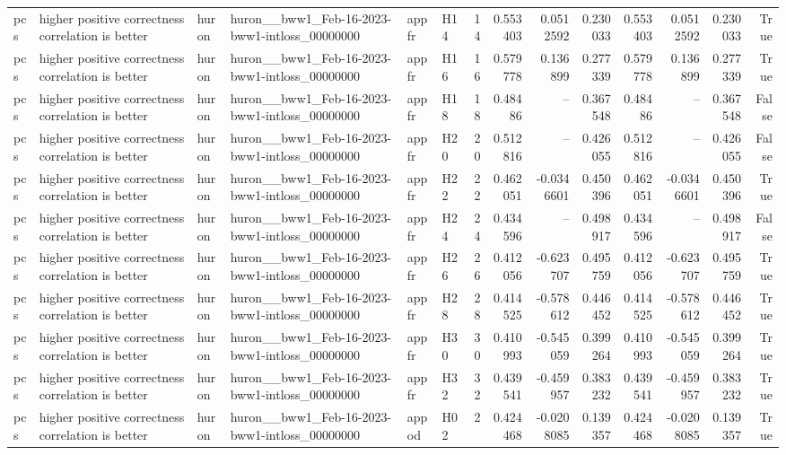 \begin{longtable}{llllllrrrrrrrr}
pcs & higher positive correctness correlation is better & huron & huron\_\_bww1\_Feb-16-2023-bww1-intloss\_00000000 & appfr & H14 & 14 & 0.553403 & 0.0512592 & 0.230033 & 0.553403 & 0.0512592 & 0.230033 & True \\
pcs & higher positive correctness correlation is better & huron & huron\_\_bww1\_Feb-16-2023-bww1-intloss\_00000000 & appfr & H16 & 16 & 0.579778 & 0.136899 & 0.277339 & 0.579778 & 0.136899 & 0.277339 & True \\
pcs & higher positive correctness correlation is better & huron & huron\_\_bww1\_Feb-16-2023-bww1-intloss\_00000000 & appfr & H18 & 18 & 0.48486 & -- & 0.367548 & 0.48486 & -- & 0.367548 & False \\
pcs & higher positive correctness correlation is better & huron & huron\_\_bww1\_Feb-16-2023-bww1-intloss\_00000000 & appfr & H20 & 20 & 0.512816 & -- & 0.426055 & 0.512816 & -- & 0.426055 & False \\
pcs & higher positive correctness correlation is better & huron & huron\_\_bww1\_Feb-16-2023-bww1-intloss\_00000000 & appfr & H22 & 22 & 0.462051 & -0.0346601 & 0.450396 & 0.462051 & -0.0346601 & 0.450396 & True \\
pcs & higher positive correctness correlation is better & huron & huron\_\_bww1\_Feb-16-2023-bww1-intloss\_00000000 & appfr & H24 & 24 & 0.434596 & -- & 0.498917 & 0.434596 & -- & 0.498917 & False \\
pcs & higher positive correctness correlation is better & huron & huron\_\_bww1\_Feb-16-2023-bww1-intloss\_00000000 & appfr & H26 & 26 & 0.412056 & -0.623707 & 0.495759 & 0.412056 & -0.623707 & 0.495759 & True \\
pcs & higher positive correctness correlation is better & huron & huron\_\_bww1\_Feb-16-2023-bww1-intloss\_00000000 & appfr & H28 & 28 & 0.414525 & -0.578612 & 0.446452 & 0.414525 & -0.578612 & 0.446452 & True \\
pcs & higher positive correctness correlation is better & huron & huron\_\_bww1\_Feb-16-2023-bww1-intloss\_00000000 & appfr & H30 & 30 & 0.410993 & -0.545059 & 0.399264 & 0.410993 & -0.545059 & 0.399264 & True \\
pcs & higher positive correctness correlation is better & huron & huron\_\_bww1\_Feb-16-2023-bww1-intloss\_00000000 & appfr & H32 & 32 & 0.439541 & -0.459957 & 0.383232 & 0.439541 & -0.459957 & 0.383232 & True \\
pcs & higher positive correctness correlation is better & huron & huron\_\_bww1\_Feb-16-2023-bww1-intloss\_00000000 & appod & H02 & 2 & 0.424468 & -0.0208085 & 0.139357 & 0.424468 & -0.0208085 & 0.139357 & True \\

\end{longtable}
